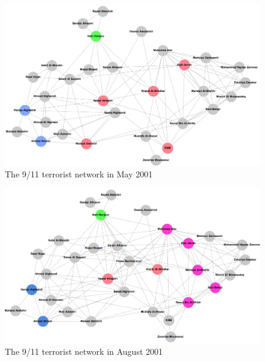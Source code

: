 \begin{subappendices}
\begin{figure}[h]
\begin{center}
\includegraphics[scale=0.4]{Images/T2001-05.png}
\end{center}
\caption{The 9/11 terrorist network in May 2001}
\label{Terrorist-May01}
\end{figure}

\begin{figure}[h]
\begin{center}
\includegraphics[scale=0.4]{Images/T2001-08.png}
\end{center}
\caption{The 9/11 terrorist network in August 2001}
\label{Terrorist-Aug01}
\end{figure}

\newpage


\end{subappendices}
